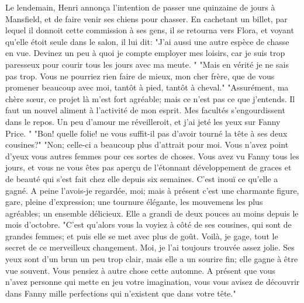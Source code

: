 Le lendemain, Henri annonça l'intention de passer une quinzaine de jours à Mansfield, et de faire venir ses chiens pour chasser. En cachetant un billet, par lequel il\setcounter{page}{250} donnoit cette commission à ses gens, il se retourna vers Flora, et voyant qu'elle étoit seule dans le salon, il lui dit: "J'ai aussi une autre espèce de chasse en vue. Devinez un peu à quoi je compte employer mes loisirs, car je suis trop paresseux pour courir tous les jours avec ma meute. "
"Mais en vérité je ne sais pas trop. Vous ne pourriez rien faire de mieux, mon cher frère, que de vous promener beaucoup avec moi, tantôt à pied, tantôt à cheval."
"Assurément, ma chère sœur, ce projet là m'est fort agréable; mais ce n'est pas ce que j'entends. Il faut un nouvel aliment à l'activité de mon esprit. Mes facultés s'engourdissent dans le repos. Un peu d'amour me réveilleroit, et j'ai jeté les yeux sur Fanny Price. "
"Bon! quelle folie! ne vous suffit-il pas d'avoir tourné la tête à ses deux cousines?"
"Non; celle-ci a beaucoup plus d'attrait pour moi. Vous n'avez point d'yeux vous autres femmes pour ces sortes de choses. Vous avez vu Fanny tous les jours, et vous ne vous êtes pas aperçu de l'étonnant développement de graces et de beauté qui s'est fait chez elle depuis six semaines. C'est inouï ce qu'elle a gagné. A peine l'avois-je regardée, moi; mais à présent c'est une charmante figure,\setcounter{page}{251} gare, pleine d'expression; une tournure élégante, les mouvemens les plus agréables; un ensemble délicieux. Elle a grandi de deux pouces au moins depuis le mois d'octobre. "C'est qu'alors vous la voyiez à côté de ses cousines, qui sont de grandes femmes; et puis elle se met avec plus de goût. Voilà, je gage, tout le secret de ce merveilleux changement. Moi, je l'ai toujours trouvée assez jolie. Ses yeux sont d'un brun un peu trop clair, mais elle a un sourire fin; elle gagne à être vue souvent. Vous pensiez à autre chose cette automne. A présent que vous n'avez personne qui mette en jeu votre imagination, vous vous avisez de découvrir dans Fanny mille perfections qui n'existent que dans votre tête."
